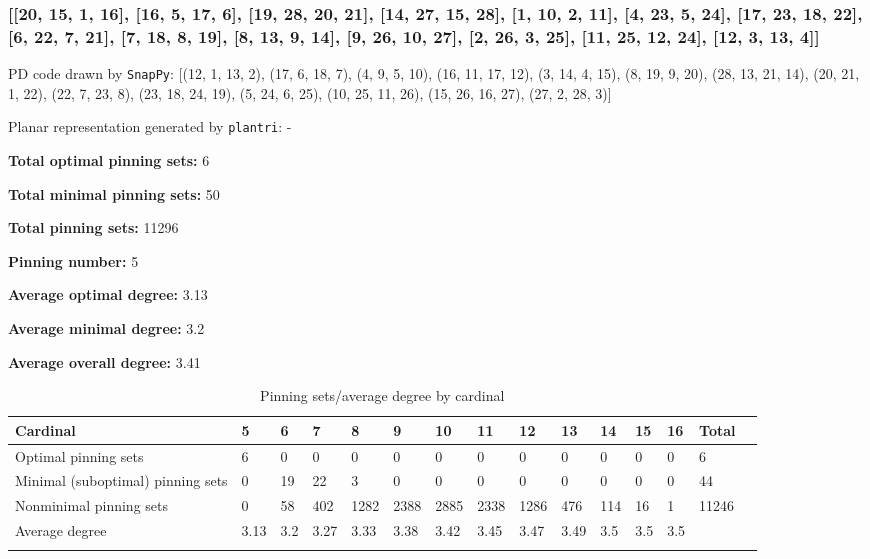 \documentclass{article}%
\begin{document}
\newpage

\subsubsection{[[20, 15, 1, 16], [16, 5, 17, 6], [19, 28, 20, 21], [14, 27, 15, 28], [1, 10, 2, 11], [4, 23, 5, 24], [17, 23, 18, 22], [6, 22, 7, 21], [7, 18, 8, 19], [8, 13, 9, 14], [9, 26, 10, 27], [2, 26, 3, 25], [11, 25, 12, 24], [12, 3, 13, 4]]}

{\small\noindent PD code drawn by \texttt{SnapPy}: [(12, 1, 13, 2), (17, 6, 18, 7), (4, 9, 5, 10), (16, 11, 17, 12), (3, 14, 4, 15), (8, 19, 9, 20), (28, 13, 21, 14), (20, 21, 1, 22), (22, 7, 23, 8), (23, 18, 24, 19), (5, 24, 6, 25), (10, 25, 11, 26), (15, 26, 16, 27), (27, 2, 28, 3)]}

{\small\noindent Planar representation generated by \texttt{plantri}: -}

\begin{multicols}{2}
{\normalsize \noindent\textbf{Total optimal pinning sets:} 6

\noindent\textbf{Total minimal pinning sets:} 50

\noindent\textbf{Total pinning sets:} 11296

\noindent\textbf{Pinning number:} 5

}
\columnbreak

{\normalsize \noindent\textbf{Average optimal degree:} 3.13

\noindent\textbf{Average minimal degree:} 3.2

\noindent\textbf{Average overall degree:} 3.41

}
\end{multicols}

\begin{table}[ht]
	\caption{Pinning sets/average degree by cardinal}
	\centering
	\renewcommand{\arraystretch}{1.5}
	\begin{tabularx}{\textwidth}{lXXXXXXXXXXXXXX}
		\toprule
			Cardinal & 5 & 6 & 7 & 8 & 9 & 10 & 11 & 12 & 13 & 14 & 15 & 16 & Total\\
			\hline
			Optimal pinning sets & 6 & 0 & 0 & 0 & 0 & 0 & 0 & 0 & 0 & 0 & 0 & 0 & 6 \\
			Minimal (suboptimal) pinning sets & 0 & 19 & 22 & 3 & 0 & 0 & 0 & 0 & 0 & 0 & 0 & 0 & 44 \\
			Nonminimal pinning sets & 0 & 58 & 402 & 1282 & 2388 & 2885 & 2338 & 1286 & 476 & 114 & 16 & 1 & 11246 \\
			Average degree & 3.13 & 3.2 & 3.27 & 3.33 & 3.38 & 3.42 & 3.45 & 3.47 & 3.49 & 3.5 & 3.5 & 3.5 &  \\
		\bottomrule \\ 
	\end{tabularx}
\end{table}
\end{document}
